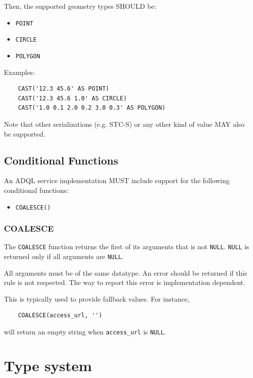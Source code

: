 \documentclass[11pt,a4paper]{ivoa}
\begin{document}
Then, the supported geometry types SHOULD be:

\begin{itemize}
    \item \verb:POINT:
    \item \verb:CIRCLE:
    \item \verb:POLYGON:
\end{itemize}

Examples:

\begin{verbatim}
    CAST('12.3 45.6' AS POINT)
    CAST('12.3 45.6 1.0' AS CIRCLE)
    CAST('1.0 0.1 2.0 0.2 3.0 0.3' AS POLYGON)
\end{verbatim}

Note that other serializations (e.g. STC-S) or any other kind of value MAY also
be supported.

\subsection{Conditional Functions}
\label{sec:condfunc}

An ADQL service implementation MUST include support for the following
conditional functions:

\begin{itemize}
    \item \verb:COALESCE():
\end{itemize}

\subsubsection{COALESCE}
\label{sec:coalesce}

The \texttt{COALESCE} function returns the first of its arguments that is not
\verb|NULL|. \verb|NULL| is returned only if all arguments are \verb|NULL|.

All arguments must be of the same datatype. An error should be returned
if this rule is not respected. The way to report this error is implementation
dependent.

This is typically used to provide fallback values. For instance,

\begin{verbatim}
    COALESCE(access_url, '')
\end{verbatim}

\noindent will return an empty string when \verb|access_url| is \verb|NULL|.

\section{Type system}
\label{sec:types}
\end{document}

